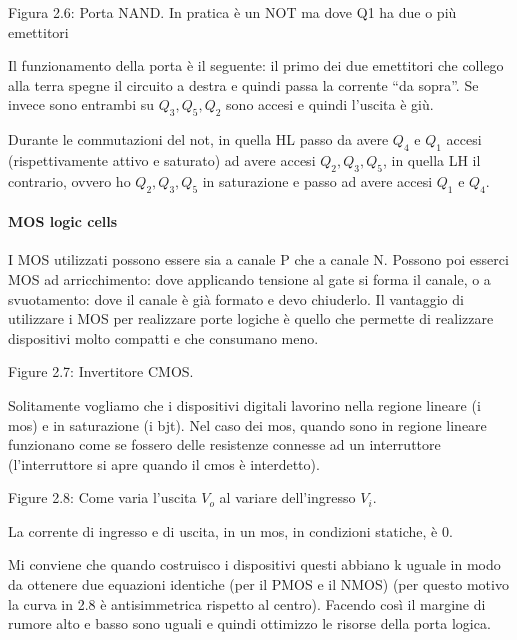 \documentclass[
]{article}
\begin{document}
Figura 2.6: Porta NAND. In pratica è un NOT ma dove Q1 ha due o più
emettitori

Il funzionamento della porta è il seguente: il primo dei due emettitori
che collego alla terra spegne il circuito a destra e quindi passa la
corrente ``da sopra''. Se invece sono entrambi su \(Q_{3},Q_{5},Q_{2}\)
sono accesi e quindi l'uscita è giù.

Durante le commutazioni del not, in quella HL passo da avere \(Q_{4}\) e
\(Q_{1}\) accesi (rispettivamente attivo e saturato) ad avere accesi
\(Q_{2},Q_{3},Q_{5}\), in quella LH il contrario, ovvero ho
\(Q_{2},Q_{3},Q_{5}\) in saturazione e passo ad avere accesi \(Q_{1}\) e
\(Q_{4}\).

\paragraph{MOS logic cells}\label{mos-logic-cells}

I MOS utilizzati possono essere sia a canale P che a canale N. Possono
poi esserci MOS ad arricchimento: dove applicando tensione al gate si
forma il canale, o a svuotamento: dove il canale è già formato e devo
chiuderlo. Il vantaggio di utilizzare i MOS per realizzare porte logiche
è quello che permette di realizzare dispositivi molto compatti e che
consumano meno.

Figure 2.7: Invertitore CMOS.

Solitamente vogliamo che i dispositivi digitali lavorino nella regione
lineare (i mos) e in saturazione (i bjt). Nel caso dei mos, quando sono
in regione lineare funzionano come se fossero delle resistenze connesse
ad un interruttore (l'interruttore si apre quando il cmos è interdetto).

Figure 2.8: Come varia l'uscita \(V_{o}\) al variare dell'ingresso
\(V_{i}\).

La corrente di ingresso e di uscita, in un mos, in condizioni statiche,
è 0.

Mi conviene che quando costruisco i dispositivi questi abbiano k uguale
in modo da ottenere due equazioni identiche (per il PMOS e il NMOS) (per
questo motivo la curva in 2.8 è antisimmetrica rispetto al centro).
Facendo così il margine di rumore alto e basso sono uguali e quindi
ottimizzo le risorse della porta logica.
\end{document}
